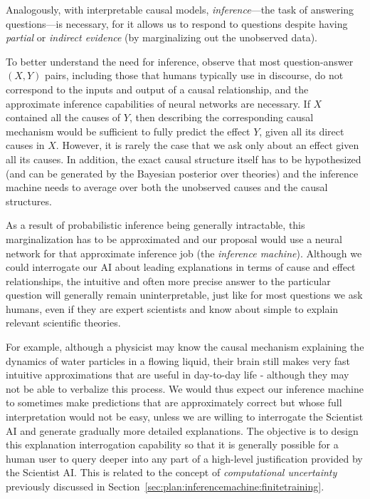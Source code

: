Analogously, with interpretable causal models, \emph{inference}---the task of answering questions---is necessary, for it allows us to respond to questions despite having \emph{partial} or \emph{indirect evidence} (by marginalizing out the unobserved data).

To better understand the need for inference, observe that most question-answer $(X,Y)$ pairs, including those that humans typically use in discourse, do not correspond to the inputs and output of a causal relationship, and the approximate inference capabilities of neural networks are necessary. If $X$ contained all the causes of $Y$, then describing the corresponding causal mechanism would be sufficient to fully predict the effect $Y$, given all its direct causes in $X$. However, it is rarely the case that we ask only about an effect given all its causes. In addition, the exact causal structure itself has to be hypothesized (and can be generated by the Bayesian posterior over theories) and the inference machine needs to average over both the unobserved causes and the causal structures.

As a result of probabilistic inference being generally intractable, this marginalization has to be approximated and our proposal would use a neural network for that approximate inference job (the \emph{inference machine}). Although we could interrogate our AI about leading explanations in terms of cause and effect relationships, the intuitive and often more precise answer to the particular question will generally remain uninterpretable, just like for most questions we ask humans, even if they are expert scientists and know about simple to explain relevant scientific theories.

For example, although a physicist may know the causal mechanism explaining the dynamics of water particles in a flowing liquid, their brain still makes very fast intuitive approximations that are useful in day-to-day life - although they may not be able to verbalize this process. We would thus expect our inference machine to sometimes make predictions that are approximately correct but whose full interpretation would not be easy, unless we are willing to interrogate the Scientist AI and generate gradually more detailed explanations. The objective is to design this explanation interrogation capability so that it is generally possible for a human user to query deeper into any part of a high-level justification provided by the Scientist AI. This is related to the concept of \emph{computational uncertainty} previously discussed in Section~\ref{sec:plan:inferencemachine:finitetraining}.

